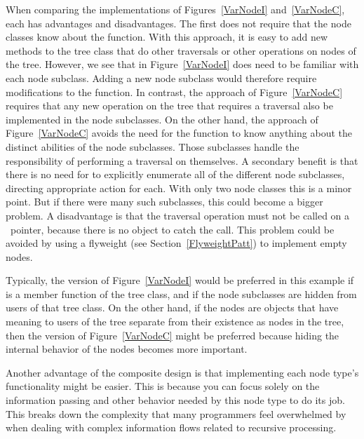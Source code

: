 When comparing the implementations of Figures~\ref{VarNodeI}
and~\ref{VarNodeC}, each has advantages and disadvantages.
The first does not require that the node classes know about
the  function.
With this approach, it is easy to add new methods to the tree class
that do other traversals or other operations on nodes of the tree.
However, we see that  in Figure~\ref{VarNodeI} does
need to be familiar with each node subclass.
Adding a new node subclass would therefore require modifications to
the  function.
In contrast, the approach of Figure~\ref{VarNodeC} requires that any
new operation on the tree that requires a traversal also be
implemented in the node subclasses.
On the other hand, the approach of Figure~\ref{VarNodeC}
avoids the need for the  function to know
anything about the distinct abilities of the node subclasses.
Those subclasses handle the responsibility of performing a traversal
on themselves.
A secondary benefit is that there is no need for  to
explicitly enumerate all of the different node subclasses,
directing appropriate action for each.
With only two node classes this is a minor point.
But if there were many such subclasses, this could become a bigger
problem.
A disadvantage is that the traversal operation must not be called on a
\NULL\ pointer, because there is no object to catch the call.
This problem could be avoided by using a flyweight (see
Section~\ref{FlyweightPatt}) to implement empty
nodes.

Typically, the version of Figure~\ref{VarNodeI} would be preferred in
this example if  is a member function of
the tree class, and if the node subclasses are hidden from users of
that tree class.
On the other hand, if the nodes are objects that have meaning
to users of the tree separate from their existence as nodes in the
tree, then the version of Figure~\ref{VarNodeC} might be preferred
because hiding the internal behavior of the nodes becomes more
important.

Another advantage of the composite design is that implementing each
node type's functionality might be easier.
This is because you can focus solely on the information passing and
other behavior needed by this node type to do its job.
This breaks down the complexity that many programmers feel overwhelmed
by when dealing with complex information flows related to recursive
processing.

